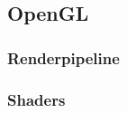 
\subsection{OpenGL}\label{subsec:opengl}

\renewcommand{\kapitelautor}{Autor: Irgendwer} %

\subsubsection{Renderpipeline}

%
%

\subsubsection{Shaders}

%
%

\renewcommand{\kapitelautor}{}
